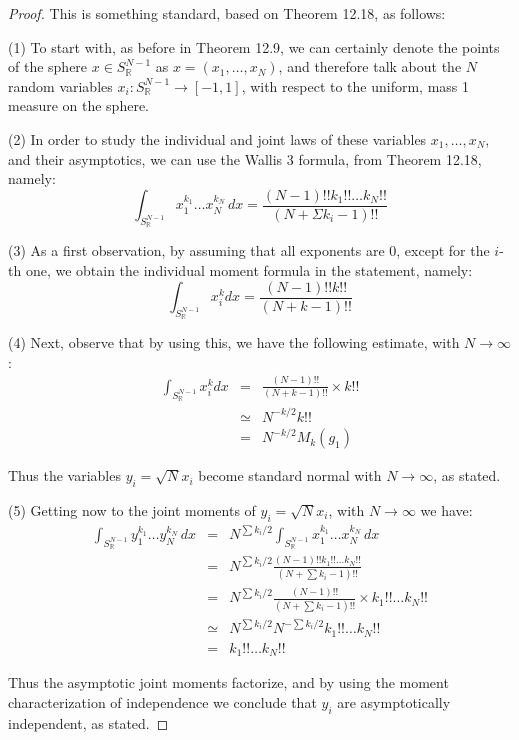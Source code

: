 \documentclass[12pt]{amsbook}
\begin{document}
\begin{proof}
This is something standard, based on Theorem 12.18, as follows:

\medskip

(1) To start with, as before in Theorem 12.9, we can certainly denote the points of the sphere $x\in S^{N-1}_\mathbb R$ as $x=(x_1,\ldots,x_N)$, and therefore talk about the $N$ random variables $x_i:S^{N-1}_\mathbb R\to[-1,1]$, with respect to the uniform, mass 1 measure on the sphere.

\medskip

(2) In order to study the individual and joint laws of these variables $x_1,\ldots,x_N$, and their asymptotics, we can use the Wallis 3 formula, from Theorem 12.18, namely:
$$\int_{S^{N-1}_\mathbb R}x_1^{k_1}\ldots x_N^{k_N}\,dx=\frac{(N-1)!!k_1!!\ldots k_N!!}{(N+\Sigma k_i-1)!!}$$

(3) As a first observation, by assuming that all exponents are 0, except for the $i$-th one, we obtain the individual moment formula in the statement, namely:
$$\int_{S^{N-1}_\mathbb R}x_i^kdx=\frac{(N-1)!!k!!}{(N+k-1)!!}$$

(4) Next, observe that by using this, we have the following estimate, with $N\to\infty$:
\begin{eqnarray*}
\int_{S^{N-1}_\mathbb R}x_i^kdx
&=&\frac{(N-1)!!}{(N+k-1)!!}\times k!!\\
&\simeq&N^{-k/2}k!!\\
&=&N^{-k/2}M_k(g_1)
\end{eqnarray*}

Thus the variables $y_i=\sqrt{N}x_i$ become standard normal with $N\to\infty$, as stated.

\medskip

(5) Getting now to the joint moments of $y_i=\sqrt{N}x_i$, with $N\to\infty$ we have:
\begin{eqnarray*}
\int_{S^{N-1}_\mathbb R}y_1^{k_1}\ldots y_N^{k_N}\,dx
&=&N^{\sum k_i/2}\int_{S^{N-1}_\mathbb R}x_1^{k_1}\ldots x_N^{k_N}\,dx\\
&=&N^{\sum k_i/2}\frac{(N-1)!!k_1!!\ldots k_N!!}{(N+\sum k_i-1)!!}\\
&=&N^{\sum k_i/2}\frac{(N-1)!!}{(N+\sum k_i-1)!!}\times k_1!!\ldots k_N!!\\
&\simeq&N^{\sum k_i/2}N^{-\sum k_i/2}k_1!!\ldots k_N!!\\
&=&k_1!!\ldots k_N!!
\end{eqnarray*}

Thus the asymptotic joint moments factorize, and by using the moment characterization of independence we conclude that $y_i$ are asymptotically independent, as stated.
\end{proof}
\end{document}
